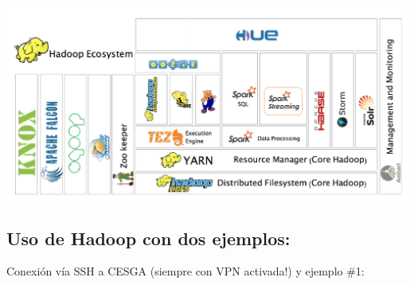 \documentclass[]{book}
\begin{document}
\includegraphics{images/T3-ecosistema.png}

\hypertarget{uso-de-hadoop-con-dos-ejemplos}{%
\subsection{Uso de Hadoop con dos ejemplos:}\label{uso-de-hadoop-con-dos-ejemplos}}

Conexión vía SSH a CESGA (siempre con VPN activada!) y ejemplo \#1:
\end{document}
